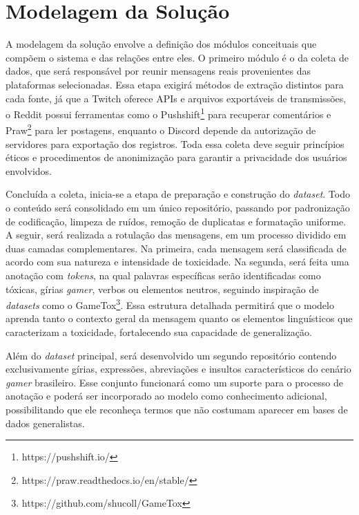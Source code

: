 \documentclass{eic-bcc-tcc}
\begin{document}
\section{Modelagem da Solução}

A modelagem da solução envolve a definição dos módulos conceituais que compõem o sistema e das relações entre eles. O primeiro módulo é o da coleta de dados, que será responsável por reunir mensagens reais provenientes das plataformas selecionadas. Essa etapa exigirá métodos de extração distintos para cada fonte, já que a Twitch oferece APIs e arquivos exportáveis de transmissões, o Reddit possui ferramentas como o Pushshift\footnote{https://pushshift.io/} para recuperar comentários e Praw\footnote{https://praw.readthedocs.io/en/stable/} para ler postagens, enquanto o Discord depende da autorização de servidores para exportação dos registros. Toda essa coleta deve seguir princípios éticos e procedimentos de anonimização para garantir a privacidade dos usuários envolvidos.


Concluída a coleta, inicia-se a etapa de preparação e construção do \textit{dataset}. Todo o conteúdo será consolidado em um único repositório, passando por padronização de codificação, limpeza de ruídos, remoção de duplicatas e formatação uniforme. A seguir, será realizada a rotulação das mensagens, em um processo dividido em duas camadas complementares. Na primeira, cada mensagem será classificada de acordo com sua natureza e intensidade de toxicidade. Na segunda, será feita uma anotação com \textit{tokens}, na qual palavras específicas serão identificadas como tóxicas, gírias \textit{gamer}, verbos ou elementos neutros, seguindo inspiração de \textit{datasets} como o GameTox\footnote{https://github.com/shucoll/GameTox}. Essa estrutura detalhada permitirá que o modelo aprenda tanto o contexto geral da mensagem quanto os elementos linguísticos que caracterizam a toxicidade, fortalecendo sua capacidade de generalização.


Além do \textit{dataset} principal, será desenvolvido um segundo repositório contendo exclusivamente gírias, expressões, abreviações e insultos característicos do cenário \textit{gamer} brasileiro. Esse conjunto funcionará como um suporte para o processo de anotação e poderá ser incorporado ao modelo como conhecimento adicional, possibilitando que ele reconheça termos que não costumam aparecer em bases de dados generalistas.
\end{document}
